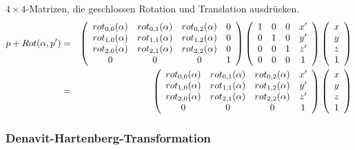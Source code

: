 $4 \times 4$-Matrizen, die geschlossen Rotation und Translation ausdrücken.
\begin{eqnarray*}
p + Rot(\alpha , p') &=& \left( \begin{array}{cccc} rot_{0,0}(\alpha) & rot_{0,1}(\alpha) & rot_{0,2}(\alpha) & 0 \\ rot_{1,0}(\alpha) & rot_{1,1}(\alpha) & rot_{1,2}(\alpha) & 0 \\ rot_{2,0}(\alpha) & rot_{2,1}(\alpha) & rot_{2,2}(\alpha) & 0 \\ 0 & 0 & 0 & 1 \end{array} \right) \left( \begin{array}{cccc} 1 & 0 & 0 & x' \\ 0 & 1 & 0 & y' \\ 0 & 0 & 1 & z' \\ 0 & 0 & 0 & 1 \end{array} \right) \left( \begin{array}{c} x \\ y \\ z \\ 1 \end{array} \right) \\
&=& \left( \begin{array}{cccc} rot_{0,0}(\alpha) & rot_{0,1}(\alpha) & rot_{0,2}(\alpha) & x' \\ rot_{1,0}(\alpha) & rot_{1,1}(\alpha) & rot_{1,2}(\alpha) & y' \\ rot_{2,0}(\alpha) & rot_{2,1}(\alpha) & rot_{2,2}(\alpha) & z' \\ 0 & 0 & 0 & 1 \end{array} \right)\left( \begin{array}{c} x \\ y \\ z \\ 1 \end{array} \right)
\end{eqnarray*}

\subsubsection*{Denavit-Hartenberg-Transformation}

